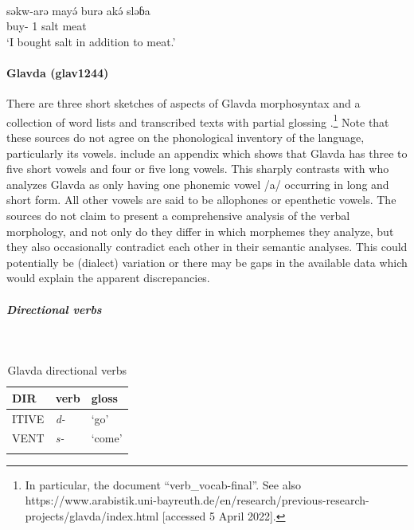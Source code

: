 \ex\label{ex2:park15}
 \\
\gll  səkw-arə mayə́ burə akə́ sləɓa \\
buy- 1 salt  meat	\\
\glt `I bought salt in addition to meat.'
\z 

\paragraph*{Glavda (glav1244)} \label{glav}

There are three short sketches of aspects of Glavda morphosyntax \citep{rappDictionaryGlavdaLanguage1968,bubaGlavdaMorphology2007,nghagyiyaSketchGlavdaGrammar2011} and a collection of word lists and transcribed texts with partial glossing \citep{owensGlavdaRuralUrban2011}.\footnote{In particular, the document ``verb\_vocab-final''. See also https://www.arabistik.uni-bayreuth.de/en/research/previous-research-projects/glavda/index.html [accessed 5 April 2022].} Note that these sources do not agree on the phonological inventory of the language, particularly its vowels. \citet{bubaGlavdaMorphology2007} include an appendix which shows that Glavda has three to five short vowels and four or five long vowels. This sharply contrasts with \citet[8]{nghagyiyaSketchGlavdaGrammar2011} who analyzes Glavda as only having one phonemic vowel /a/ occurring in long and short form. All other vowels are said to be allophones or epenthetic vowels. The sources do not claim to present a comprehensive analysis of the verbal morphology, and not only do they differ in which morphemes they analyze, but they also occasionally contradict each other in their semantic analyses. This could potentially be (dialect) variation or there may be gaps in the available data which would explain the apparent discrepancies. 

\subparagraph{Directional verbs}~

\begin{table}[H]
	\caption{Glavda directional verbs} 
	\label{tab:glavV}
	\begin{tabular}{lll} %
		\lsptoprule
		DIR & verb & gloss   \\ %
		\midrule
		ITIVE & \textit{d-} & `go' \\
		VENT & \textit{s-} & `come' \\
		\lspbottomrule
	\end{tabular}
\end{table}

